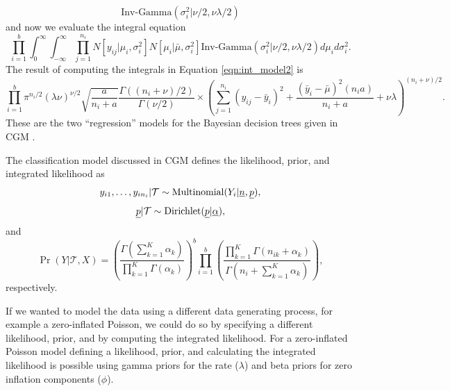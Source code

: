 \begin{equation}\label{eqn:sigma_priors}
\text{Inv-Gamma}(\sigma_i^2\vert\nu/2, \nu\lambda/2)
\end{equation}
 and now we evaluate the integral equation 
 \begin{equation}\label{eqn:int_model2}
\prod_{i=1}^b \int_0^\infty \int_{-\infty}^{\infty} \prod_{j=1}^{n_i} N[y_{ij} \vert \mu_i, \sigma_i^2]N[\mu_i\vert \bar{\mu}, \sigma_i^2 ]\text{Inv-Gamma}(\sigma_i^2\vert \nu/2, \nu\lambda/2)d\mu_id\sigma_i^2. 
\end{equation}
The result of computing the integrals in Equation \ref{eqn:int_model2} is 
\begin{equation}\label{eqn:int_model3}
\prod_{i=1}^b\pi^{n_i/2}(\lambda\nu)^{\nu/2}\sqrt{\frac{a}{n_i+a}}\frac{\Gamma((n_i+\nu)/2)}{\Gamma(\nu/2)}\times \left( \sum_{j=1}^{n_{i}}(y_{ij}-\bar{y}_i)^2+ \frac{(\bar{y}_i -\bar{\mu})^2(n_ia)}{n_i+a}+\nu\lambda  \right)^{(n_i+\nu)/2}.
\end{equation}
These are the two ``regression'' models for the Bayesian decision trees given in CGM \cite{chipman1998bayesian}. 

The classification model discussed in CGM \cite{chipman1998bayesian} defines the likelihood, prior, and integrated likelihood as
\begin{equation}
y_{i1}, \dots, y_{in_i} \vert \mathcal{T} \sim \text{Multinomial}(Y_i \vert \vec{n}, \vec{p}),\newnot{symbol:mult}
\end{equation} 
\begin{equation}
\vec{p} \vert \mathcal{T} \sim \text{Dirichlet}(\vec{p}\vert \vec{\alpha}), \newnot{symbol:dirichlet}
\end{equation} 
and
\begin{equation}\label{eqn:int_model4}
\Pr(Y\vert \mathcal{T}, X)=\left(\frac{\Gamma(\sum_{k=1}^K\alpha_k)}{\prod_{k=1}^K\Gamma(\alpha_k)} \right)^b \prod_{i=1}^b\left( \frac{\prod_{k=1}^K\Gamma(n_{ik}+\alpha_k)}{\Gamma(n_i +\sum_{k=1}^K\alpha_k)} \right),
\end{equation} 
respectively. 
 
If we wanted to model the data using a different data generating process, for example a zero-inflated Poisson, we could do so by specifying a different likelihood, prior, and by computing the integrated likelihood. For a zero-inflated Poisson model defining a likelihood, prior, and calculating the integrated likelihood is possible using gamma priors for the rate ($\lambda$) and beta priors for zero inflation components ($\phi$). 
 
